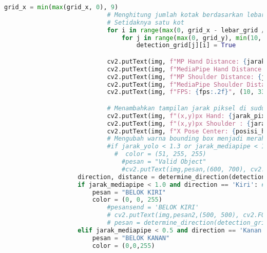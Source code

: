 \begin{lstlisting}[language=Python]
                            grid_x = min(max(grid_x, 0), 9)
                            # Menghitung jumlah kotak berdasarkan lebar dalam meter
                            # Setidaknya satu kot
                            for i in range(max(0, grid_x - lebar_grid // 2), min(10, grid_x + lebar_grid // 2)):
                                for j in range(max(0, grid_y), min(10, grid_y + lebar_grid // 2)):
                                    detection_grid[j][i] = True

                            cv2.putText(img, f"MP Hand Distance: {jarak_mediapipe:.2f} m", (x1, y1 - 10), cv2.FONT_HERSHEY_SIMPLEX, 0.6, (0, 255, 0), 2)
                            cv2.putText(img, f"MediaPipe Hand Distance: {jarak_mediapipe:.2f}", (10, 180), cv2.FONT_HERSHEY_SIMPLEX, 0.6, (255, 255, 255), 2)
                            cv2.putText(img, f"MP Shoulder Distance: {jarak_mediapipebahu:.2f}", (x1,y1 - 35), cv2.FONT_HERSHEY_SIMPLEX, 0.6, (0,255,0), 2)
                            cv2.putText(img, f"MediaPipe Shoulder Distance: {jarak_mediapipebahu:.2f}", (10 , 210), cv2.FONT_HERSHEY_SIMPLEX,0.6, (255,255,255),2)
                            cv2.putText(img, f"FPS: {fps:.2f}", (10, 330), cv2.FONT_HERSHEY_SIMPLEX, 0.6, (255, 255, 255), 2)

                            # Menambahkan tampilan jarak piksel di sudut kiri atas
                            cv2.putText(img, f"(x,y)px Hand: {jarak_pix:.2f}", (10, 30), cv2.FONT_HERSHEY_SIMPLEX, 0.6, (255, 255, 255), 2)
                            cv2.putText(img, f"(x,y)px Shoulder : {jarak_pixbahu:.2f}", (10, 60), cv2.FONT_HERSHEY_SIMPLEX, 0.6,(255,255,255),2 )
                            cv2.putText(img, f"X Pose Center: {posisi_horizontal_piksel:.2f}px", (10, 90), cv2.FONT_HERSHEY_SIMPLEX, 0.6, (255, 255, 255), 2)
                            # Mengubah warna bounding box menjadi merah jika kedua jarak terpenuhi
                            #if jarak_yolo < 1.3 or jarak_mediapipe < 1.3:
                              #  color = (51, 255, 255)
                                #pesan = "Valid Object"
                                #cv2.putText(img,pesan,(600, 700), cv2.FONT_HERSHEY_SIMPLEX, 1, (0, 255, 255), 1)
                    direction, distance = determine_direction(detection_grid)
                    if jarak_mediapipe < 1.0 and direction == 'Kiri': #or lebar_bounding_box > 500:
                        pesan = "BELOK KIRI"
                        color = (0, 0, 255)
                            #pesansend = 'BELOK KIRI'
                            # cv2.putText(img,pesan2,(500, 500), cv2.FONT_HERSHEY_SIMPLEX, 1, (0, 0, 255), 1)
                            # pesan = determine_direction(detection_grid, grid_size=10)
                    elif jarak_mediapipe < 0.5 and direction == 'Kanan':
                        pesan = "BELOK KANAN"
                        color = (0,0,255)


\end{lstlisting}

